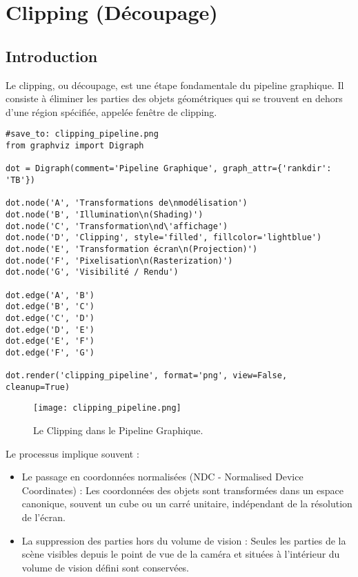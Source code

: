 \documentclass{article}
\begin{document}
\sloppy

\section{Clipping (Découpage)}

\subsection{Introduction}

Le clipping, ou découpage, est une étape fondamentale du pipeline graphique. Il consiste à éliminer les parties des objets géométriques qui se trouvent en dehors d'une région spécifiée, appelée fenêtre de clipping.

\begin{verbatim}
#save_to: clipping_pipeline.png
from graphviz import Digraph

dot = Digraph(comment='Pipeline Graphique', graph_attr={'rankdir': 'TB'})

dot.node('A', 'Transformations de\nmodélisation')
dot.node('B', 'Illumination\n(Shading)')
dot.node('C', 'Transformation\nd\'affichage')
dot.node('D', 'Clipping', style='filled', fillcolor='lightblue')
dot.node('E', 'Transformation écran\n(Projection)')
dot.node('F', 'Pixelisation\n(Rasterization)')
dot.node('G', 'Visibilité / Rendu')

dot.edge('A', 'B')
dot.edge('B', 'C')
dot.edge('C', 'D')
dot.edge('D', 'E')
dot.edge('E', 'F')
dot.edge('F', 'G')

dot.render('clipping_pipeline', format='png', view=False, cleanup=True)
\end{verbatim}

\begin{figure}[H]
\centering
\texttt{[image: clipping\_pipeline.png]}
\caption{Le Clipping dans le Pipeline Graphique.}
\label{fig:clipping_pipeline}
\end{figure}

Le processus implique souvent :
\begin{itemize}
    \item Le passage en coordonnées normalisées (NDC - Normalised Device Coordinates) : Les coordonnées des objets sont transformées dans un espace canonique, souvent un cube ou un carré unitaire, indépendant de la résolution de l'écran.
    \item La suppression des parties hors du volume de vision : Seules les parties de la scène visibles depuis le point de vue de la caméra et situées à l'intérieur du volume de vision défini sont conservées.
\end{itemize}
\end{document}
